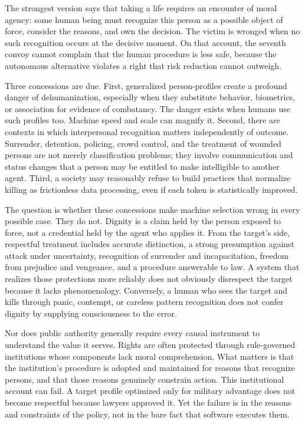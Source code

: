 \documentclass[11pt]{article}
\begin{document}
The strongest version says that taking a life requires an encounter of moral agency: some human being must recognize this person as a possible object of force, consider the reasons, and own the decision. The victim is wronged when no such recognition occurs at the decisive moment. On that account, the seventh convoy cannot complain that the human procedure is less safe, because the autonomous alternative violates a right that risk reduction cannot outweigh.

Three concessions are due. First, generalized person-profiles create a profound danger of dehumanization, especially when they substitute behavior, biometrics, or association for evidence of combatancy. The danger exists when humans use such profiles too. Machine speed and scale can magnify it. Second, there are contexts in which interpersonal recognition matters independently of outcome. Surrender, detention, policing, crowd control, and the treatment of wounded persons are not merely classification problems; they involve communication and status changes that a person may be entitled to make intelligible to another agent. Third, a society may reasonably refuse to build practices that normalize killing as frictionless data processing, even if each token is statistically improved.

The question is whether these concessions make machine selection wrong in every possible case. They do not. Dignity is a claim held by the person exposed to force, not a credential held by the agent who applies it. From the target's side, respectful treatment includes accurate distinction, a strong presumption against attack under uncertainty, recognition of surrender and incapacitation, freedom from prejudice and vengeance, and a procedure answerable to law. A system that realizes those protections more reliably does not obviously disrespect the target because it lacks phenomenology. Conversely, a human who sees the target and kills through panic, contempt, or careless pattern recognition does not confer dignity by supplying consciousness to the error.

Nor does public authority generally require every causal instrument to understand the value it serves. Rights are often protected through rule-governed institutions whose components lack moral comprehension. What matters is that the institution's procedure is adopted and maintained for reasons that recognize persons, and that those reasons genuinely constrain action. This institutional account can fail. A target profile optimized only for military advantage does not become respectful because lawyers approved it. Yet the failure is in the reasons and constraints of the policy, not in the bare fact that software executes them.
\end{document}
